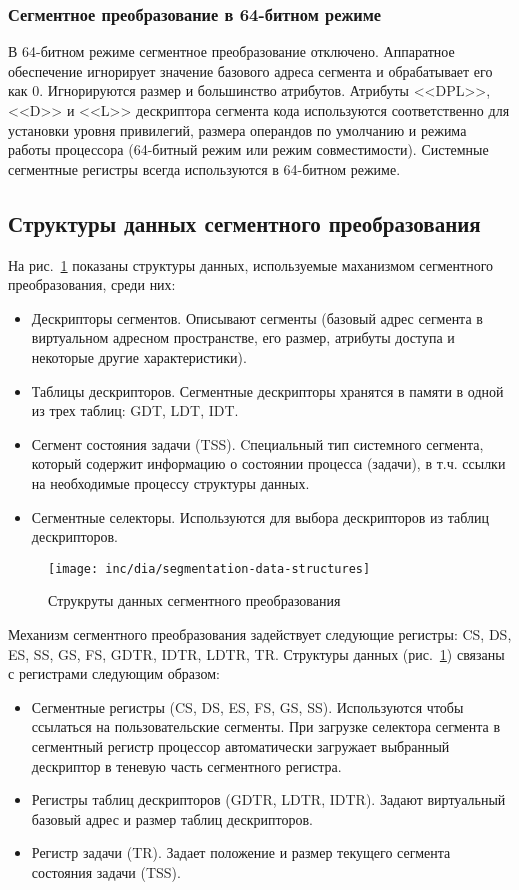 \subsubsection*{Сегментное преобразование в 64-битном режиме}
В 64-битном режиме сегментное преобразование отключено. Аппаратное обеспечение игнорирует значение
базового адреса сегмента и обрабатывает его как 0. Игнорируются размер и большинство атрибутов.
Атрибуты <<DPL>>, <<D>> и <<L>> дескриптора сегмента кода используются соответственно для установки
уровня привилегий, размера операндов по умолчанию и режима работы процессора (64-битный режим или режим совместимости).
Системные сегментные регистры всегда используются в 64-битном режиме.

\subsection{Структуры данных сегментного преобразования}
На рис.~\ref{fig:segmentation-data-structures} показаны структуры данных, используемые
маханизмом сегментного преобразования, среди них:
\begin{itemize}
\item Дескрипторы сегментов. Описывают сегменты (базовый адрес сегмента в виртуальном
	адресном пространстве, его размер, атрибуты доступа и некоторые другие характеристики).
\item Таблицы дескрипторов. Сегментные дескрипторы хранятся в памяти в одной из трех таблиц: GDT, LDT, IDT.
\item Сегмент состояния задачи (TSS). Cпециальный тип системного сегмента, который содержит
	информацию о состоянии процесса (задачи), в т.ч. ссылки на необходимые процессу структуры данных.
\item Сегментные селекторы. Используются для выбора дескрипторов из таблиц дескрипторов.
\end{itemize}

\begin{figure}[ht!]
  \centering
  \texttt{[image: inc/dia/segmentation-data-structures]}
  \caption{Струкруты данных сегментного преобразования}
  \label{fig:segmentation-data-structures}
\end{figure}

Механизм сегментного преобразования задействует следующие регистры: CS, DS, ES, SS, GS, FS, GDTR, IDTR, LDTR, TR.
Структуры данных (рис.~\ref{fig:segmentation-data-structures}) связаны с регистрами следующим образом:
\begin{itemize}
	\item Сегментные регистры (CS, DS, ES, FS, GS, SS). Используются чтобы ссылаться
		на пользовательские сегменты. При загрузке селектора сегмента в сегментный регистр процессор
		автоматически загружает выбранный дескриптор в теневую часть сегментного регистра.
	\item Регистры таблиц дескрипторов (GDTR, LDTR, IDTR). Задают виртуальный базовый адрес и размер таблиц дескрипторов.
	\item Регистр задачи (TR). Задает положение и размер текущего сегмента состояния задачи (TSS).
\end{itemize}

